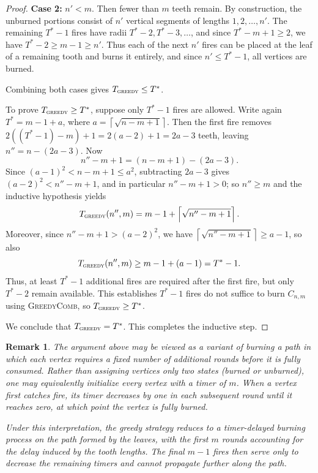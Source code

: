 \documentclass{article}
\newcommand{\gr}{\textsc{greedy}}
\newtheorem{remark}{Remark}
\begin{document}
\begin{proof}
\smallskip
\textbf{Case 2:} $n'<m$.
Then fewer than $m$ teeth remain. By construction, the unburned portions
consist of $n'$ vertical segments of lengths $1,2,\ldots,n'$.
The remaining $T^*-1$ fires have radii $T^*-2,T^*-3,\ldots$, and since
$T^* - m+1 \ge 2$, we have
$T^*-2 \ge m-1 \ge n'$.
Thus each of the next $n'$ fires can be placed at the leaf of a remaining
tooth and burns it entirely, and since $n'\le T^*-1$, all vertices are burned.

Combining both cases gives $T_\gr \le T^*$.

\medskip
To prove $T_\gr \ge T^*$, suppose only $T^*-1$ fires are allowed.
Write again $T^* = m-1+a$, where
$a=\left\lceil \sqrt{n-m+1} \right\rceil$.
Then the first fire removes
$2((T^*-1)-m)+1 = 2(a-2)+1 = 2a-3$
teeth, leaving
$n'' = n-(2a-3)$.
Now
\[
n''-m+1
=
(n-m+1)-(2a-3).
\]
Since $(a-1)^2 < n-m+1 \le a^2$, subtracting $2a-3$ gives $(a-2)^2 < n''-m+1$, and in particular $n''-m+1>0$; so $n''\ge m$ and the inductive hypothesis yields
\[
T_\gr({n'',m})
=
m-1+\left\lceil \sqrt{n''-m+1} \right\rceil.
\]
Moreover, since $n''-m+1>(a-2)^2$, we have
$\left\lceil \sqrt{n''-m+1} \right\rceil \ge a-1$, so also
\[
T_\gr({n'',m})
\ge m-1+(a-1)
= T^*-1.
\]
Thus, at least $T^*-1$ additional fires are required after the first fire,
but only $T^*-2$ remain available. This establishes $T^*-1$ fires do not suffice to burn $C_{n,m}$ using \textsc{GreedyComb},
so $T_\gr \ge T^*$.

We conclude that $T_\gr = T^*$. This completes the inductive step.
\end{proof}

\begin{remark}
    The argument above may be viewed as a variant of burning a path in which each
    vertex requires a fixed number of additional rounds before it is fully
    consumed. Rather than assigning vertices only two states (burned or
    unburned), one may equivalently initialize every vertex with a timer of
    $m$. When a vertex first catches fire, its timer decreases by one in each
    subsequent round until it reaches zero, at which point the vertex is fully
    burned. 
    
    Under this interpretation, the greedy strategy reduces to a timer-delayed burning
    process on the path formed by the leaves, with the first $m$ rounds accounting
    for the delay induced by the tooth lengths. The final $m-1$ fires then serve
    only to decrease the remaining timers and cannot propagate further along the
    path.
\end{remark}
\end{document}
